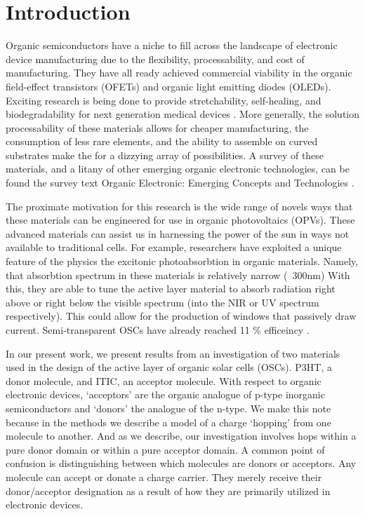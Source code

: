 \chapter{Introduction} 
Organic semiconductors have a niche to fill across the landscape of electronic
device manufacturing due to the flexibility, processability, and cost of manufacturing. They have all ready
achieved commercial viability in the organic field-effect transistors (OFETs) and organic light emitting
diodes (OLEDs).
Exciting research is being done to provide stretchability, self-healing, and biodegradability for 
next generation medical devices \cite{Brutting2006}.
More generally, the solution processability of these materials allows for
cheaper manufacturing, the consumption of less rare elements, and the ability to assemble on curved substrates make the for a dizzying array of possibilities. A survey of these materials, and a litany of
other emerging organic electronic technologies, can be found the survey text 
Organic Electronic: Emerging Concepts and Technologies
\cite{FabioCicoiraEditor2013}. 

The proximate  motivation for this research is the wide range of novels ways that these materials can be
engineered for use in organic photovoltaics (OPVs). 
These advanced materials
can assist us in harnessing the power of the sun in ways not available to traditional cells. 
For example, researchers have exploited a unique feature of the physics the excitonic photoabsorbtion in 
organic materials.  Namely, that absorbtion spectrum
in these materials is relatively narrow (~300nm)
With this, they are able to tune the active layer material to absorb radiation right above or right below the
visible spectrum (into the NIR or UV spectrum respectively). This 
could allow for the production of windows that passively draw current. Semi-transparent OSCs have already
reached 11 \% efficeincy \cite{Brabec2020}. 

In our present work, we present results from an investigation of two materials
used in the design of the active layer of organic solar cells (OSCs). P3HT, a
donor molecule, and ITIC, an acceptor molecule. With respect to organic electronic devices, `acceptors' are the
organic analogue of p-type inorganic semiconductors and `donors' the analogue
of the n-type. We make this note because in the methods we describe a model of
a charge `hopping' from one molecule to another. And as we describe, our
investigation involves hops within a pure donor domain or within a pure
acceptor domain. A common point of confusion is distinguishing between which
molecules are donors or acceptors.
Any molecule can accept or donate a charge carrier.
They merely receive their donor/acceptor designation as a result of how they
are primarily utilized in electronic devices. 

